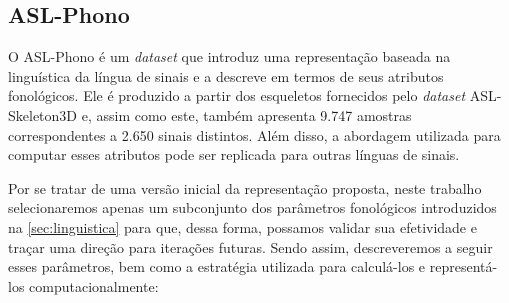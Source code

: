 \subsection{ASL-Phono}
\label{sec:metodologia-datasets-phono}

O ASL-Phono é um \textit{dataset} que introduz uma representação baseada na linguística da língua de sinais e a descreve em termos de seus atributos fonológicos. 
Ele é produzido a partir dos esqueletos fornecidos pelo \textit{dataset} ASL-Skeleton3D e, assim como este, também apresenta 9.747 amostras correspondentes a 2.650 sinais distintos. 
Além disso, a abordagem utilizada para computar esses atributos pode ser replicada para outras línguas de sinais.

Por se tratar de uma versão inicial da representação proposta, neste trabalho selecionaremos apenas um subconjunto dos parâmetros fonológicos introduzidos na \autoref{sec:linguistica} para que, dessa forma, possamos validar sua efetividade e traçar uma direção para iterações futuras.
Sendo assim, descreveremos a seguir esses parâmetros, bem como a estratégia utilizada para calculá-los e representá-los computacionalmente:


